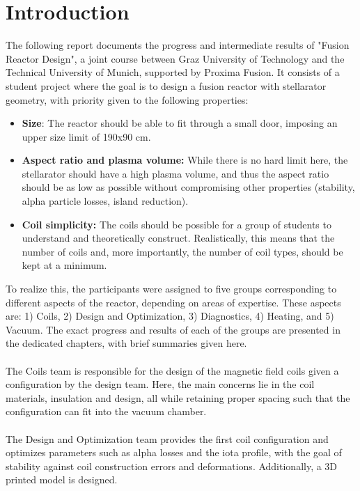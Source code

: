 \section{Introduction}
The following report documents the progress and intermediate results of "Fusion Reactor Design", a joint course between Graz University of Technology and the Technical University of Munich, supported by Proxima Fusion. It consists of a student project where the goal is to design a fusion reactor with stellarator geometry, with priority given to the following properties:
\begin{itemize}
    \item \textbf{Size}: The reactor should be able to fit through a small door, imposing an upper size limit of 190x90 cm.
    \item \textbf{Aspect ratio and plasma volume:} While there is no hard limit here, the stellarator should have a high plasma volume, and thus the aspect ratio should be as low as possible without compromising other properties (stability, alpha particle losses, island reduction).
    \item \textbf{Coil simplicity:} The coils should be possible for a group of students to understand and theoretically construct. Realistically, this means that the number of coils and, more importantly, the number of coil types, should be kept at a minimum.

\end{itemize}
To realize this, the participants were assigned to five groups corresponding to different aspects of the reactor, depending on areas of expertise. These aspects are: 1) Coils, 2) Design and Optimization, 3) Diagnostics, 4) Heating, and 5) Vacuum. The exact progress and results of each of the groups are presented in the dedicated chapters, with brief summaries given here.\\
\\
The Coils team is responsible for the design of the magnetic field coils given a configuration by the design team. Here, the main concerns lie in the coil materials, insulation and design, all while retaining proper spacing such that the configuration can fit into the vacuum chamber.\\
\\
The Design and Optimization team provides the first coil configuration and optimizes parameters such as alpha losses and the iota profile, with the goal of stability against coil construction errors and deformations. Additionally, a 3D printed model is designed.\\
